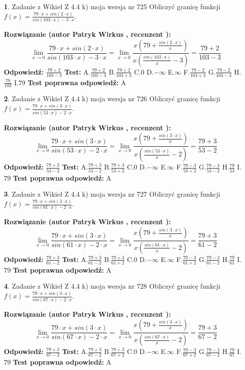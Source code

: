 \documentclass[12pt, a4paper]{article}
\theoremstyle{definition} %
\newtheorem{zad}{}
\newcommand{\zadStart}[1]{\begin{zad}#1\newline}
\newcommand{\zadStop}{\end{zad}}
\newcommand{\rozwStart}[2]{\noindent \textbf{Rozwiązanie (autor #1 , recenzent #2): }\newline}
\newcommand{\rozwStop}{\newline}
\newcommand{\odpStart}{\noindent \textbf{Odpowiedź:}\newline}
\newcommand{\odpStop}{\newline}
\newcommand{\testStart}{\noindent \textbf{Test:}\newline}
\newcommand{\testStop}{\newline}
\newcommand{\kluczStart}{\noindent \textbf{Test poprawna odpowiedź:}\newline}
\newcommand{\kluczStop}{\newline}
\begin{document}
\zadStart{Zadanie z Wikieł Z 4.4 k) moja wersja nr 725}
Obliczyć granicę funkcji $f(x)=\frac{79\cdot x +sin(2\cdot x)}{sin(103\cdot x) -3\cdot x}$.
\zadStop
\rozwStart{Patryk Wirkus}{}
$$\lim\limits_{x\to 0}\frac{79\cdot x +sin(2\cdot x)}{sin(103\cdot x) -3\cdot x}
=\lim\limits_{x\to 0}\frac{x(79+\frac{sin(2\cdot x)}{x})}{x(\frac{sin(103\cdot x)}{x}-3)}
=\frac{79+2}{103-3}$$
\rozwStop
\odpStart
$\frac{79+2}{103-3}$
\odpStop
\testStart
A.$\frac{79+2}{103-3}$
B.$\frac{79+2}{103+3}$
C.$0$
D.$-\infty$
E.$\infty$
F.$\frac{79-2}{103+3}$
G.$\frac{79-2}{103-3}$
H.$\frac{79}{103}$
I.$79$
\testStop
\kluczStart
A
\kluczStop



\zadStart{Zadanie z Wikieł Z 4.4 k) moja wersja nr 726}
Obliczyć granicę funkcji $f(x)=\frac{79\cdot x +sin(3\cdot x)}{sin(53\cdot x) -2\cdot x}$.
\zadStop
\rozwStart{Patryk Wirkus}{}
$$\lim\limits_{x\to 0}\frac{79\cdot x +sin(3\cdot x)}{sin(53\cdot x) -2\cdot x}
=\lim\limits_{x\to 0}\frac{x(79+\frac{sin(3\cdot x)}{x})}{x(\frac{sin(53\cdot x)}{x}-2)}
=\frac{79+3}{53-2}$$
\rozwStop
\odpStart
$\frac{79+3}{53-2}$
\odpStop
\testStart
A.$\frac{79+3}{53-2}$
B.$\frac{79+3}{53+2}$
C.$0$
D.$-\infty$
E.$\infty$
F.$\frac{79-3}{53+2}$
G.$\frac{79-3}{53-2}$
H.$\frac{79}{53}$
I.$79$
\testStop
\kluczStart
A
\kluczStop



\zadStart{Zadanie z Wikieł Z 4.4 k) moja wersja nr 727}
Obliczyć granicę funkcji $f(x)=\frac{79\cdot x +sin(3\cdot x)}{sin(61\cdot x) -2\cdot x}$.
\zadStop
\rozwStart{Patryk Wirkus}{}
$$\lim\limits_{x\to 0}\frac{79\cdot x +sin(3\cdot x)}{sin(61\cdot x) -2\cdot x}
=\lim\limits_{x\to 0}\frac{x(79+\frac{sin(3\cdot x)}{x})}{x(\frac{sin(61\cdot x)}{x}-2)}
=\frac{79+3}{61-2}$$
\rozwStop
\odpStart
$\frac{79+3}{61-2}$
\odpStop
\testStart
A.$\frac{79+3}{61-2}$
B.$\frac{79+3}{61+2}$
C.$0$
D.$-\infty$
E.$\infty$
F.$\frac{79-3}{61+2}$
G.$\frac{79-3}{61-2}$
H.$\frac{79}{61}$
I.$79$
\testStop
\kluczStart
A
\kluczStop



\zadStart{Zadanie z Wikieł Z 4.4 k) moja wersja nr 728}
Obliczyć granicę funkcji $f(x)=\frac{79\cdot x +sin(3\cdot x)}{sin(67\cdot x) -2\cdot x}$.
\zadStop
\rozwStart{Patryk Wirkus}{}
$$\lim\limits_{x\to 0}\frac{79\cdot x +sin(3\cdot x)}{sin(67\cdot x) -2\cdot x}
=\lim\limits_{x\to 0}\frac{x(79+\frac{sin(3\cdot x)}{x})}{x(\frac{sin(67\cdot x)}{x}-2)}
=\frac{79+3}{67-2}$$
\rozwStop
\odpStart
$\frac{79+3}{67-2}$
\odpStop
\testStart
A.$\frac{79+3}{67-2}$
B.$\frac{79+3}{67+2}$
C.$0$
D.$-\infty$
E.$\infty$
F.$\frac{79-3}{67+2}$
G.$\frac{79-3}{67-2}$
H.$\frac{79}{67}$
I.$79$
\testStop
\kluczStart
A
\kluczStop
\end{document}
